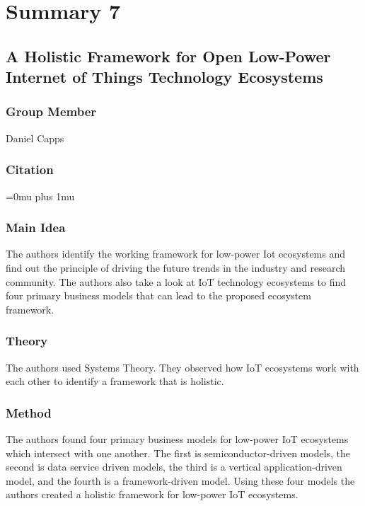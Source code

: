 \section{Summary 7}

\noindent
\subsection{{A} {H}olistic {F}ramework for {O}pen {L}ow-{P}ower {I}nternet of {T}hings {T}echnology {E}cosystems}

\subsubsection{Group Member}

\noindent
Daniel Capps

\noindent
\subsubsection{Citation}

\Urlmuskip=0mu plus 1mu\relax


\subsubsection{Main Idea}

\noindent
The authors identify the working framework for low-power Iot ecosystems and find out the principle of driving the future trends in the industry and research community. The  authors also take a look at IoT technology ecosystems to find four primary business models that can lead to the proposed ecosystem framework. 

 



\subsubsection{Theory}

\noindent
The authors used Systems Theory. They observed how IoT ecosystems work with each other to identify a framework that is holistic. 




\subsubsection{Method}

\noindent
The authors found four primary business models for low-power IoT ecosystems which intersect with one another. The first is semiconductor-driven models, the second is data service driven models, the third is a vertical application-driven model, and the fourth is a framework-driven model. Using these four models the authors created a holistic framework for low-power IoT ecosystems.




